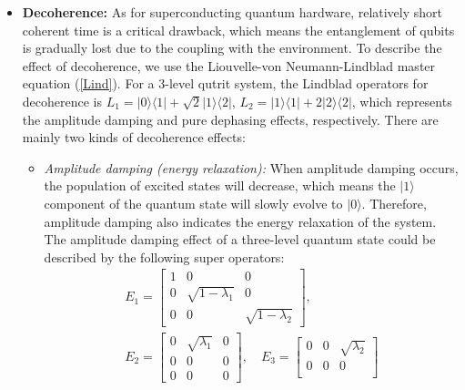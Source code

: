 \documentclass[conference, 9pt]{IEEEtran}
\begin{document}
\begin{itemize}
    
    
    \item \textbf{Decoherence:} As for superconducting quantum hardware, relatively short coherent time is a critical drawback, which means the entanglement of qubits is gradually lost due to the coupling with the environment. To describe the effect of decoherence, we use the Liouvelle-von Neumann-Lindblad master equation (\ref{Lind}). 
    For a 3-level qutrit system, the Lindblad operators for decoherence is $L_1 =|0\rangle\langle 1| + \sqrt{2}|1\rangle\langle 2|$, $L_2 = |1\rangle\langle 1| + 2|2\rangle \langle 2|$, which represents the amplitude damping and pure dephasing effects,  respectively.
    There are mainly two kinds of decoherence effects:
    \begin{itemize}
        \item \textit{Amplitude damping (energy relaxation):} When amplitude damping occurs, the population of excited states will decrease, which means the $|1\rangle$ component of the quantum state will slowly evolve to $|0\rangle$. Therefore, amplitude damping also indicates the energy relaxation of the system. 
        \iffalse
        The amplitude damping effect of a three-level quantum state could be described by the following super operators: 
        \begin{equation*}
        \begin{aligned}
            E_1 = \begin{bmatrix}
            1 & 0 & 0 \\
            0 & \sqrt{1 - \lambda_1} & 0 \\
            0 & 0 & \sqrt{1 - \lambda_2}
            \end{bmatrix} 
            , \\ E_2 = \begin{bmatrix}
            0 & \sqrt{\lambda_1} & 0 \\
            0 & 0 & 0 \\
            0 & 0 & 0
            \end{bmatrix}, \quad
            E_3 = \begin{bmatrix}
            0 & 0 & \sqrt{\lambda_2} \\
            0 & 0 & 0 \\

\end{bmatrix}
\end{aligned}
\end{equation*}
\end{itemize}
\end{itemize}
\end{document}

